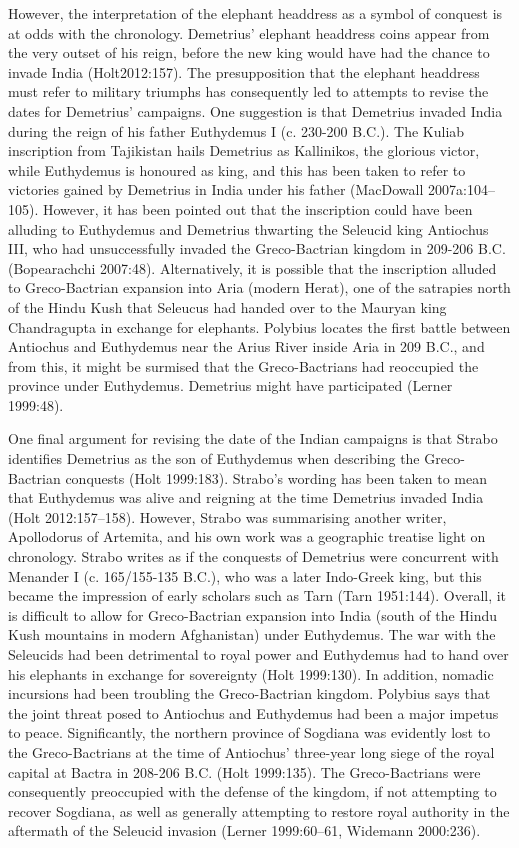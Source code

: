 \documentclass{ijsra}
\begin{document}
However, the interpretation of the elephant headdress as a symbol of conquest is at odds with the chronology.
Demetrius’ elephant headdress coins appear from the very outset of his reign, before the new king would have had the chance
to invade India (Holt2012:157).
The presupposition that the elephant headdress must refer to military triumphs has consequently led to attempts to revise the dates
for Demetrius’ campaigns.
One suggestion is that Demetrius invaded India during the reign of his father Euthydemus I (c. 230-200 B.C.).
The Kuliab inscription from Tajikistan hails Demetrius as Kallinikos, the glorious victor, while Euthydemus is honoured as king,
and this has been taken to refer to victories gained by Demetrius in India under his father (MacDowall 2007a:104–105).
However, it has been pointed out that the inscription could have been alluding to Euthydemus and Demetrius thwarting the Seleucid king
Antiochus III, who had unsuccessfully invaded the Greco-Bactrian kingdom in 209-206 B.C. (Bopearachchi 2007:48).
Alternatively, it is possible that the inscription alluded to Greco-Bactrian expansion into Aria (modern Herat),
one of the satrapies north of the Hindu Kush that Seleucus had handed over to the Mauryan king Chandragupta in exchange for elephants.
Polybius locates the first battle between Antiochus and Euthydemus near the Arius River inside Aria in 209 B.C.,
and from this, it might be surmised that the Greco-Bactrians had reoccupied the province under Euthydemus.
Demetrius might have participated (Lerner 1999:48).

One final argument for revising the date of the Indian campaigns is that Strabo identifies Demetrius as the son of
Euthydemus when describing the Greco-Bactrian conquests (Holt 1999:183).
Strabo’s wording has been taken to mean that Euthydemus was alive and reigning at the time Demetrius invaded India (Holt 2012:157–158). 
However, Strabo was summarising another writer, Apollodorus of Artemita, and his own work was a geographic treatise light on chronology.
Strabo writes as if the conquests of Demetrius were concurrent with Menander I (c. 165/155-135 B.C.), who was a later Indo-Greek king,
but this became the impression of early scholars such as Tarn (Tarn 1951:144).
Overall, it is difficult to allow for Greco-Bactrian expansion into India (south of the Hindu Kush mountains in modern Afghanistan)
under Euthydemus.
The war with the Seleucids had been detrimental to royal power and Euthydemus had to hand over his elephants in exchange for
sovereignty (Holt 1999:130).
In addition, nomadic incursions had been troubling the Greco-Bactrian kingdom.
Polybius says that the joint threat posed to Antiochus and Euthydemus had been a major impetus to peace.
Significantly, the northern province of Sogdiana was evidently lost to the Greco-Bactrians at the time of Antiochus’
three-year long siege of the royal capital at Bactra in 208-206 B.C. (Holt 1999:135).
The Greco-Bactrians were consequently preoccupied with the defense of the kingdom, if not attempting to recover Sogdiana,
as well as generally attempting to restore royal authority in the aftermath of the Seleucid invasion
(Lerner 1999:60–61, Widemann 2000:236).
\end{document}
